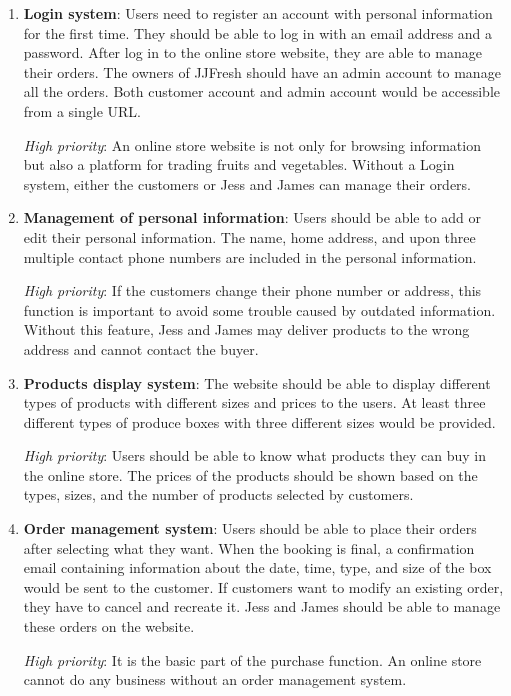 \documentclass{report}
\begin{document}
\begin{enumerate}
  \item \textbf{Login system}: Users need to register an account with personal information for the first time. They should be able to log in with an email address and a password. After log in to the online store website, they are able to manage their orders. The owners of JJFresh should have an admin account to manage all the orders. Both customer account and admin account would be accessible from a single URL.
  
  \textit{High priority}: An online store website is not only for browsing information but also a platform for trading fruits and vegetables. Without a Login system, either the customers or Jess and James can manage their orders.

  \item \textbf{Management of personal information}: Users should be able to add or edit their personal information. The name, home address, and upon three multiple contact phone numbers are included in the personal information.
  
  \textit{High priority}: If the customers change their phone number or address, this function is important to avoid some trouble caused by outdated information. Without this feature, Jess and James may deliver products to the wrong address and cannot contact the buyer.
  
  \item \textbf{Products display system}: The website should be able to display different types of products with different sizes and prices to the users. At least three different types of produce boxes with three different sizes would be provided.
  
  \textit{High priority}: Users should be able to know what products they can buy in the online store. The prices of the products should be shown based on the types, sizes, and the number of products selected by customers.
  
  \item \textbf{Order management system}: Users should be able to place their orders after selecting what they want. When the booking is final, a confirmation email containing information about the date, time, type, and size of the box would be sent to the customer. If customers want to modify an existing order, they have to cancel and recreate it. Jess and James should be able to manage these orders on the website.
  
  \textit{High priority}: It is the basic part of the purchase function. An online store cannot do any business without an order management system.
  

\end{enumerate}
\end{document}
